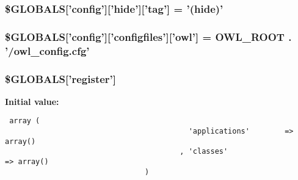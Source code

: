 \hypertarget{config_8php_15cc7b8e0baf358db666b97bd9c7fcf5}{
\subsubsection{\setlength{\rightskip}{0pt plus 5cm}\$GLOBALS\mbox{[}'config'\mbox{]}\mbox{[}'hide'\mbox{]}\mbox{[}'tag'\mbox{]} = '(hide)'}}
\label{config_8php_15cc7b8e0baf358db666b97bd9c7fcf5}


\hypertarget{config_8php_36e909583250c43d72bdc7c09e2d4a20}{
\subsubsection{\setlength{\rightskip}{0pt plus 5cm}\$GLOBALS\mbox{[}'config'\mbox{]}\mbox{[}'configfiles'\mbox{]}\mbox{[}'owl'\mbox{]} = {\bf OWL\_\-ROOT} . '/owl\_\-config.cfg'}}
\label{config_8php_36e909583250c43d72bdc7c09e2d4a20}


\hypertarget{config_8php_6cc1ef3a8c20d69988531d27f931855b}{
\subsubsection{\setlength{\rightskip}{0pt plus 5cm}\$GLOBALS\mbox{[}'register'\mbox{]}}}
\label{config_8php_6cc1ef3a8c20d69988531d27f931855b}


\textbf{Initial value:}

\begin{Code}\begin{verbatim} array (
                                          'applications'        => array()
                                        , 'classes'                     => array()
                                )
\end{verbatim}
\end{Code}

